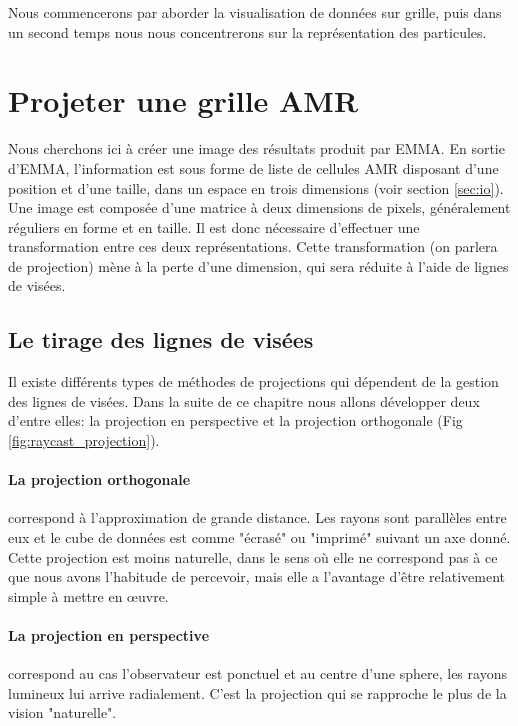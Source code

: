 Nous commencerons par aborder la visualisation de données sur grille, puis dans un second temps nous nous concentrerons sur la représentation des particules.


\section{Projeter une grille AMR}

Nous cherchons ici à créer une image des résultats produit par EMMA.
En sortie d'EMMA, l'information est sous forme de liste de cellules \ac{AMR} disposant d'une position et d'une taille, dans un espace en trois dimensions (voir section \ref{sec:io}).
Une image est composée d'une matrice à deux dimensions de pixels, généralement réguliers en forme et en taille.
Il est donc nécessaire d'effectuer une transformation entre ces deux représentations.
Cette transformation (on parlera de projection) mène à la perte d'une dimension, qui sera réduite à l'aide de lignes de visées.

\subsection{Le tirage des lignes de visées}

Il existe différents types de méthodes de projections qui dépendent de la gestion des lignes de visées.
Dans la suite de ce chapitre nous allons développer deux d'entre elles: la projection en perspective et la projection orthogonale (Fig \ref{fig:raycast_projection}).

\paragraph{La projection orthogonale} correspond à l'approximation de grande distance.
Les rayons sont parallèles entre eux et le cube de données est comme "écrasé" ou "imprimé" suivant un axe donné.
Cette projection est moins naturelle, dans le sens où elle ne correspond pas à ce que nous avons l'habitude de percevoir, mais elle a l'avantage d'être relativement simple à mettre en œuvre.

\paragraph{La projection en perspective} correspond au cas l'observateur est ponctuel et au centre d'une sphere, les rayons lumineux lui arrive radialement.
C'est la projection qui se rapproche le plus de la vision "naturelle".

